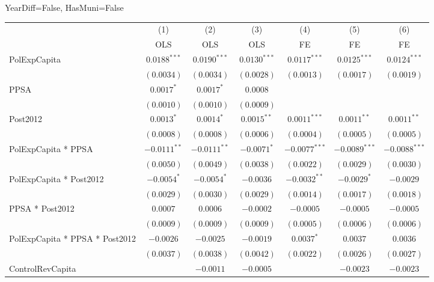 \documentclass[border=10pt,varwidth=25cm]{standalone}
\renewenvironment{table}[1][]{}{}
\begin{document}
\begin{table}[H]
    \centering
    \scriptsize
    \begin{minipage}{\textwidth}
    \centering
    {\normalsize YearDiff=False, HasMuni=False}
    \vspace{6pt}
    \begin{tabular}{lcccccc}
        \toprule
         & (1) & (2) & (3) & (4) & (5) & (6) \\
         & OLS & OLS & OLS & FE & FE & FE \\
        \midrule
        PolExpCapita & $0.0188^{***}$ & $0.0190^{***}$ & $0.0130^{***}$ & $0.0117^{***}$ & $0.0125^{***}$ & $0.0124^{***}$ \\
         & $(0.0034)$ & $(0.0034)$ & $(0.0028)$ & $(0.0013)$ & $(0.0017)$ & $(0.0019)$ \\[4pt]
        PPSA & $0.0017^{*}$ & $0.0017^{*}$ & $0.0008$ &  &  &  \\
         & $(0.0010)$ & $(0.0010)$ & $(0.0009)$ &  &  &  \\[4pt]
        Post2012 & $0.0013^{*}$ & $0.0014^{*}$ & $0.0015^{**}$ & $0.0011^{***}$ & $0.0011^{**}$ & $0.0011^{**}$ \\
         & $(0.0008)$ & $(0.0008)$ & $(0.0006)$ & $(0.0004)$ & $(0.0005)$ & $(0.0005)$ \\[4pt]
        PolExpCapita * PPSA & $-0.0111^{**}$ & $-0.0111^{**}$ & $-0.0071^{*}$ & $-0.0077^{***}$ & $-0.0089^{***}$ & $-0.0088^{***}$ \\
         & $(0.0050)$ & $(0.0049)$ & $(0.0038)$ & $(0.0022)$ & $(0.0029)$ & $(0.0030)$ \\[4pt]
        PolExpCapita * Post2012 & $-0.0054^{*}$ & $-0.0054^{*}$ & $-0.0036$ & $-0.0032^{**}$ & $-0.0029^{*}$ & $-0.0029$ \\
         & $(0.0029)$ & $(0.0030)$ & $(0.0029)$ & $(0.0014)$ & $(0.0017)$ & $(0.0018)$ \\[4pt]
        PPSA * Post2012 & $0.0007$ & $0.0006$ & $-0.0002$ & $-0.0005$ & $-0.0005$ & $-0.0005$ \\
         & $(0.0009)$ & $(0.0009)$ & $(0.0009)$ & $(0.0005)$ & $(0.0006)$ & $(0.0006)$ \\[4pt]
        PolExpCapita * PPSA * Post2012 & $-0.0026$ & $-0.0025$ & $-0.0019$ & $0.0037^{*}$ & $0.0037$ & $0.0036$ \\
         & $(0.0037)$ & $(0.0038)$ & $(0.0042)$ & $(0.0022)$ & $(0.0026)$ & $(0.0027)$ \\[4pt]
        ControlRevCapita &  & $-0.0011$ & $-0.0005$ &  & $-0.0023$ & $-0.0023$ \\

\end{tabular}
\end{minipage}
\end{table}
\end{document}
